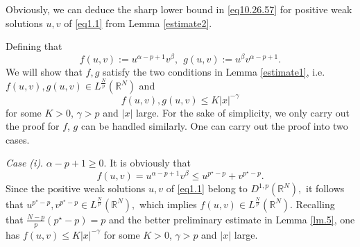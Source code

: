 \documentclass[12pt]{amsart}
\theoremstyle{definition}
\theoremstyle{remark}
\theoremstyle{conclusion}
\theoremstyle{conjecture}
\numberwithin{equation}{section}
\newcommand{\R}{\mathbb{R}}
\begin{document}
Obviously, we can deduce the sharp lower bound in \eqref{eq10.26.57} for positive weak solutions $u, v$ of \eqref{eq1.1} from Lemma \ref{estimate2}.

Defining that
$$f(u,v):=u^{\alpha-p+1}v^{\beta}, \ \ g(u,v):=u^{\beta}v^{\alpha-p+1}.$$
We will show that $f,g$ satisfy the two conditions in Lemma \ref{estimate1}, i.e. $f(u,v), g(u,v)\in L^\frac{N}{p}(\R^N)$ and
\begin{equation}\label{a6}
  f(u,v), g(u,v) \leq K|x|^{-\gamma}
\end{equation}
for some $K>0$, $\gamma>p$ and $|x|$ large. For the sake of simplicity, we only carry out the proof for $f$, $g$ can be handled similarly. One can carry out the proof into two cases.

\emph{Case (i)}. $\alpha-p+1\geq0.$ It is obviously that
$$f(u,v)=u^{\alpha-p+1}v^{\beta}\leq u^{p^\star-p}+v^{p^\star-p}.$$
Since the positive weak solutions $u,v$ of \eqref{eq1.1} belong to $D^{1,p}(\R^N),$ it follows that $u^{p^\star-p}, v^{p^\star-p}\in L^\frac{N}{p}(\R^N),$
which implies $f(u,v)\in L^\frac{N}{p}(\R^N)$. Recalling that $\frac{N-p}{p}(p^\star-p)=p$ and the better preliminary estimate in Lemma \ref{lm.5},
one has $f(u,v)\leq K|x|^{-\gamma}$ for some $K>0$, $\gamma>p$ and $|x|$ large.
\end{document}
